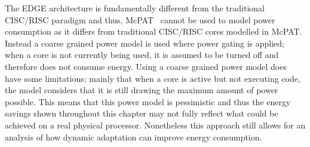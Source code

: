 The EDGE architecture is fundamentally different from the traditional CISC/RISC paradigm and thus, McPAT~\cite{mcpat} cannot be used to model power consumption as it differs from traditional CISC/RISC cores modelled in McPAT.
Instead a coarse grained power model is used where power gating is applied; when a core is not currently being used, it is assumed to be turned off and therefore does not consume energy.
Using a coarse grained power model does have some limitations; mainly that when a core is active but not executing code, the model considers that it is still drawing the maximum amount of power possible.
This means that this power model is pessimistic and thus the energy savings shown throughout this chapter may not fully reflect what could be achieved on a real physical processor.
Nonetheless this approach still allows for an analysis of how dynamic adaptation can improve energy consumption.
